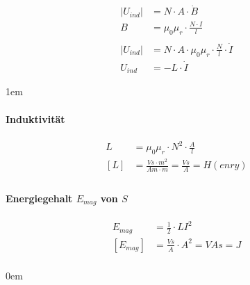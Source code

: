 \begin{align*}
  \left| U_{ind} \right| &= N \cdot A \cdot \dot{B} &\\
  B &= \mu_0 \mu_r \cdot \frac{N \cdot I}{l} &\\
  &\\
  \left| U_{ind} \right| &= N \cdot A \cdot \mu_0 \mu_r \cdot \frac{N}{l} \cdot \dot{I} &\\
  U_{ind} &= -L \cdot \dot{I}
\end{align*}

\leftskip1em
\paragraph{Induktivität}

\begin{align*}
  L &= \mu_0 \mu_r \cdot N^2 \cdot \frac{A}{l} &\\
  [L] &= \frac{Vs \cdot m^2}{Am \cdot m} = \frac{Vs}{A} = H(enry) &\\
\end{align*}

\paragraph{Energiegehalt $E_{mag}$ von $S$}

\begin{align*}
  E_{mag} &= \frac{1}{2} \cdot L I^2 &\\
  [E_{mag}] &= \frac{Vs}{A} \cdot A^2 = VAs = J &\\
\end{align*}

\leftskip0em
